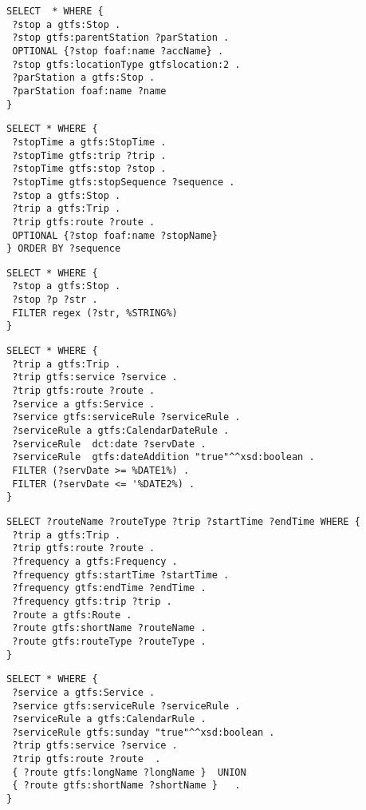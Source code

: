 \begin{lstlisting}[caption=Query 13 - All the accesses of the stations, label=lst:sparql13,basicstyle=\small,frame=single]
SELECT  * WHERE {     
 ?stop a gtfs:Stop .
 ?stop gtfs:parentStation ?parStation .
 OPTIONAL {?stop foaf:name ?accName} .
 ?stop gtfs:locationType gtfslocation:2 .
 ?parStation a gtfs:Stop .
 ?parStation foaf:name ?name      
}
\end{lstlisting}

\begin{lstlisting}[caption=Query 14 - All stops times and their related routes and stops order by their sequence,label=lst:sparql14,basicstyle=\small,frame=single]
SELECT * WHERE {
 ?stopTime a gtfs:StopTime .
 ?stopTime gtfs:trip ?trip .
 ?stopTime gtfs:stop ?stop .
 ?stopTime gtfs:stopSequence ?sequence .
 ?stop a gtfs:Stop .
 ?trip a gtfs:Trip .
 ?trip gtfs:route ?route .
 OPTIONAL {?stop foaf:name ?stopName} 
} ORDER BY ?sequence
\end{lstlisting}

\begin{lstlisting}[caption=Query 15 - Everything that contains a specific string in the object placeholder (any property), label=lst:sparql15, basicstyle=\small,frame=single]
SELECT * WHERE { 
 ?stop a gtfs:Stop .
 ?stop ?p ?str .
 FILTER regex (?str, %STRING%)
}
\end{lstlisting}

\begin{lstlisting}[caption={Query 16 - For all the routes, all the calendar changes during a specific month}, label=lst:sparql16, basicstyle=\small,frame=single]
SELECT * WHERE {
 ?trip a gtfs:Trip .
 ?trip gtfs:service ?service .
 ?trip gtfs:route ?route . 
 ?service a gtfs:Service .
 ?service gtfs:serviceRule ?serviceRule .
 ?serviceRule a gtfs:CalendarDateRule .
 ?serviceRule  dct:date ?servDate .
 ?serviceRule  gtfs:dateAddition "true"^^xsd:boolean .
 FILTER (?servDate >= %DATE1%) .
 FILTER (?servDate <= '%DATE2%) .
}
\end{lstlisting}

\begin{lstlisting}[caption=Query 17 - Trips with their start and end time of the frequencies and associated routes, label=lst:sparql17, basicstyle=\small,frame=single]
SELECT ?routeName ?routeType ?trip ?startTime ?endTime WHERE {
 ?trip a gtfs:Trip .
 ?trip gtfs:route ?route .
 ?frequency a gtfs:Frequency .
 ?frequency gtfs:startTime ?startTime .
 ?frequency gtfs:endTime ?endTime .
 ?frequency gtfs:trip ?trip .
 ?route a gtfs:Route .
 ?route gtfs:shortName ?routeName .
 ?route gtfs:routeType ?routeType .
}
\end{lstlisting}

\begin{lstlisting}[caption={Query 18 - All routes that have trips on Sunday}, label=lst:sparql18, basicstyle=\small,frame=single]
SELECT * WHERE {
 ?service a gtfs:Service .
 ?service gtfs:serviceRule ?serviceRule .
 ?serviceRule a gtfs:CalendarRule .
 ?serviceRule gtfs:sunday "true"^^xsd:boolean . 
 ?trip gtfs:service ?service .
 ?trip gtfs:route ?route  .
 { ?route gtfs:longName ?longName }  UNION
 { ?route gtfs:shortName ?shortName } 	.
}
\end{lstlisting}

